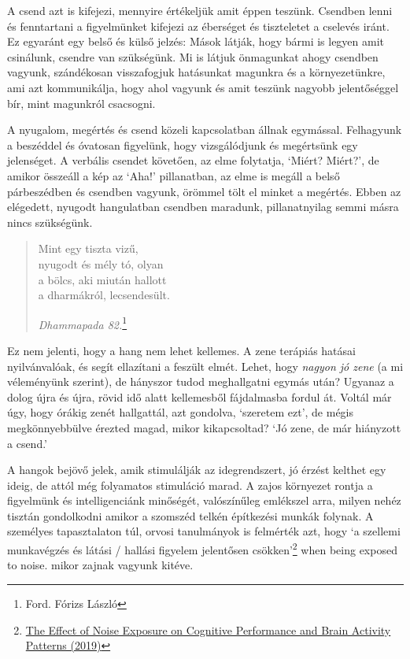 A csend azt is kifejezi, mennyire értékeljük amit éppen teszünk.
Csendben lenni és fenntartani a figyelmünket kifejezi az éberséget és
tiszteletet a cselevés iránt. Ez egyaránt egy belső és külső jelzés:
Mások látják, hogy bármi is legyen amit csinálunk, csendre van
szükségünk. Mi is látjuk önmagunkat ahogy csendben vagyunk, szándékosan
visszafogjuk hatásunkat magunkra és a környezetünkre, ami azt
kommunikálja, hogy ahol vagyunk és amit teszünk nagyobb jelentőséggel
bír, mint magunkról csacsogni.

A nyugalom, megértés és csend közeli kapcsolatban állnak egymással.
Felhagyunk a beszéddel és óvatosan figyelünk, hogy vizsgálódjunk és
megértsünk egy jelenséget. A verbális csendet követően, az elme
folytatja, `Miért? Miért?', de amikor összeáll a kép az `Aha!'
pillanatban, az elme is megáll a belső párbeszédben és csendben vagyunk,
örömmel tölt el minket a megértés. Ebben az elégedett, nyugodt
hangulatban csendben maradunk, pillanatnyilag semmi másra nincs
szükségünk.

\begin{quote}
Mint egy tiszta vizű,\\
nyugodt és mély tó, olyan\\
a bölcs, aki miután hallott\\
a dharmákról, lecsendesült.

\emph{Dhammapada 82.}\footnote{Ford. Fórizs László}
\end{quote}

Ez nem jelenti, hogy a hang nem lehet kellemes. A zene terápiás hatásai
nyilvánvalóak, és segít ellazítani a feszült elmét. Lehet, hogy
\emph{nagyon jó zene} (a mi véleményünk szerint), de hányszor tudod
meghallgatni egymás után? Ugyanaz a dolog újra és újra, rövid idő alatt
kellemesből fájdalmasba fordul át. Voltál már úgy, hogy órákig zenét
hallgattál, azt gondolva, `szeretem ezt', de mégis megkönnyebbülve
érezted magad, mikor kikapcsoltad? `Jó zene, de már hiányzott a csend.'

A hangok bejövő jelek, amik stimulálják az idegrendszert, jó érzést
kelthet egy ideig, de attól még folyamatos stimuláció marad. A zajos
környezet rontja a figyelmünk és intelligenciánk minőségét, valószínűleg
emlékszel arra, milyen nehéz tisztán gondolkodni amikor a szomszéd
telkén építkezési munkák folynak. A személyes tapasztalaton túl, orvosi
tanulmányok is felmérték azt, hogy `a szellemi munkavégzés és látási /
hallási figyelem jelentősen csökken'\footnote{\href{https://www.ncbi.nlm.nih.gov/pmc/articles/PMC6901841/}{The
  Effect of Noise Exposure on Cognitive Performance and Brain Activity
  Patterns (2019)}} when being exposed to noise. mikor zajnak vagyunk
kitéve.

